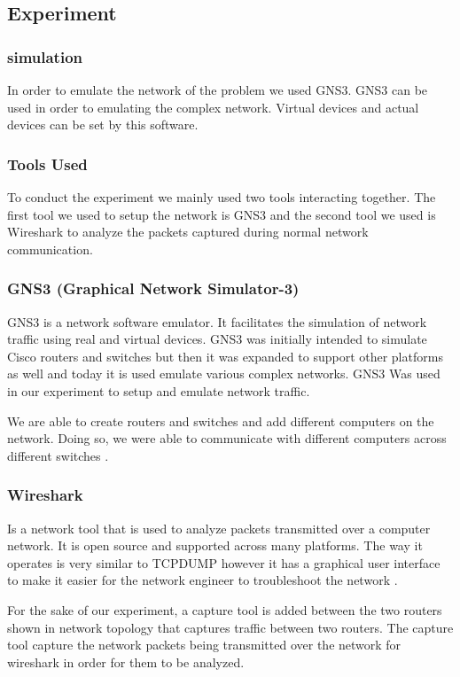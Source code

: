 \documentclass{article}
\begin{document}
\subsection{Experiment}
\subsubsection{simulation}
In order to emulate the network of the problem we used GNS3. GNS3 can be used in order to emulating the complex network. Virtual devices and actual devices can be set by this software\cite{amyot2014system}.


\subsubsection{Tools Used}
To conduct the experiment we mainly used two tools interacting together. The first tool we used to setup the network is GNS3 and the second tool we used is Wireshark to analyze the packets captured during normal network communication.


\subsubsection{GNS3 (Graphical Network Simulator-3)}
GNS3 is a network software emulator. It facilitates the simulation of network traffic using real and virtual devices. GNS3 was initially intended to simulate Cisco routers and switches but then it was expanded to support other platforms as well and today it is used emulate various complex networks.  GNS3 Was used in our experiment to setup and emulate network traffic. 


We are able to create routers and switches and add different computers on the network. Doing so, we were able to communicate with different computers across different switches \cite{hassine2014toward}.


\subsubsection{Wireshark}
Is a network tool that is used to analyze packets transmitted over a computer network. It is open source and supported across many platforms. The way it operates is very similar to TCPDUMP however it has a graphical user interface to make it easier for the network engineer to troubleshoot the network \cite{orebaugh2006wireshark}.


For the sake of our experiment, a capture tool is added between the two routers shown in network topology that captures traffic between two routers. The capture tool capture the network packets being transmitted over the network for wireshark in order for them to be analyzed.
\end{document}
